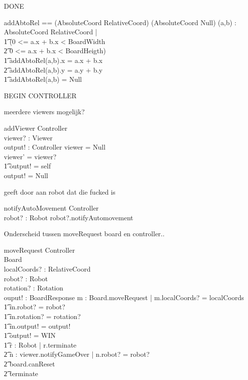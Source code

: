\documentclass[a4paper,11pt]{article}
\begin{document}
DONE
\begin{axdef}
addAbtoRel == (AbsoluteCoord \cross RelativeCoord) \rightarrow (AbsoluteCoord \union Null)
\where
\forall (a,b) : AbsoluteCoord \cross RelativeCoord | \\ \t1
\IF (0 <= a.x + b.x < BoardWidth \\ \t2
0 <= a.x + b.x < BoardHeigth) \\ \t1
\THEN
addAbtoRel(a,b).x = a.x + b.x \\ \t2
addAbtoRel(a,b).y = a.y + b.y \\ \t1
\ELSE addAbtoRel(a,b) = Null
\end{axdef}


BEGIN CONTROLLER

meerdere viewers mogelijk?
\begin{schema}{addViewer}
\Delta Controller \\
viewer? : Viewer \\
output! : Controller 
\where
\IF viewer = Null \\
\THEN viewer' = viewer? \\ \t1
output! = self \\
\ELSE output! = Null
\end{schema}


geeft door aan robot dat die fucked is
\begin{schema}{notifyAutoMovement}
\Xi Controller \\
robot? : Robot
\where
robot?.notifyAutomovement
\end{schema}

Onderscheid tussen moveRequest board en controller..
\begin{schema}{moveRequest}
\Xi Controller \\
\Delta Board \\
localCoords? : RelativeCoord \\
robot? : Robot \\
rotation? : Rotation \\
ouput! : BoardResponse
\where
\exists m : Board.moveRequest | m.localCoords? = localCoords \\ \t1
m.robot? = robot? \\ \t1
m.rotation? = rotation? \\ \t1
m.output! = output! \\ \t1
\IF output! = WIN \\ \t1
\THEN \forall r : Robot | r.terminate \\ \t2
\exists n : viewer.notifyGameOver | n.robot? = robot? \\ \t2
board.canReset \\ \t2
terminate
\end{schema}
\end{document}
